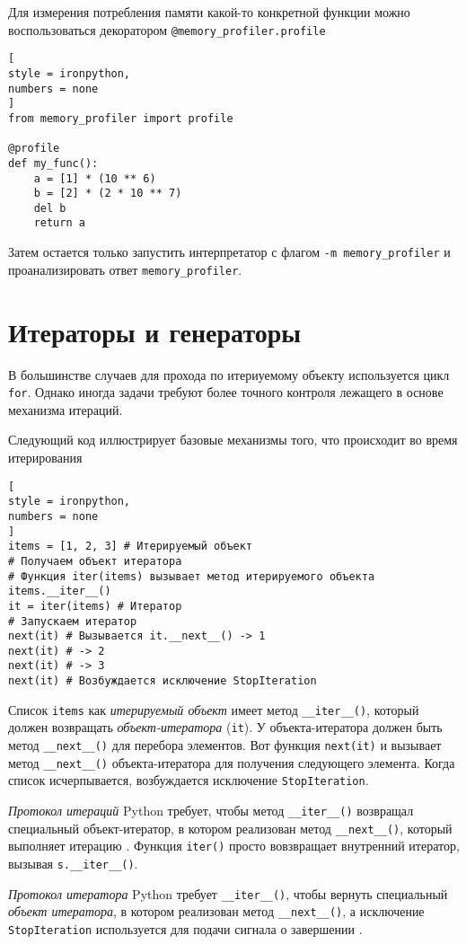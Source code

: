 \documentclass[%
	11pt,
	a4paper,
	utf8,
		]{article}
\begin{document}
Для измерения потребления памяти какой-то конкретной функции можно воспользоваться декоратором \texttt{@memory\_profiler.profile}
\begin{lstlisting}[
style = ironpython,
numbers = none
]
from memory_profiler import profile

@profile
def my_func():
    a = [1] * (10 ** 6)
    b = [2] * (2 * 10 ** 7)
    del b
    return a
\end{lstlisting}

Затем остается только запустить интерпретатор с флагом \verb|-m memory_profiler| и проанализировать ответ \texttt{memory\_profiler}.


\section{Итераторы и генераторы}

В большинстве случаев для прохода по итериуемому объекту используется цикл \texttt{for}. Однако иногда задачи требуют более точного контроля лежащего в основе механизма итераций. 

Следующий код иллюстрирует базовые механизмы того, что происходит во время итерирования
\begin{lstlisting}[
style = ironpython,
numbers = none
]
items = [1, 2, 3] # Итерируемый объект
# Получаем объект итератора
# Функция iter(items) вызывает метод итерируемого объекта items.__iter__()
it = iter(items) # Итератор
# Запускаем итератор
next(it) # Вызывается it.__next__() -> 1
next(it) # -> 2
next(it) # -> 3
next(it) # Возбуждается исключение StopIteration
\end{lstlisting}

Список \texttt{items} как \emph{итерируемый объект} имеет метод \verb|__iter__()|, который должен возвращать \emph{объект-итератора} (\texttt{it}). У объекта-итератора должен быть метод \verb|__next__()| для перебора элементов. Вот функция \texttt{next(it)} и вызывает метод \verb|__next__()| объекта-итератора для получения следующего элемента. Когда список исчерпывается, возбуждается исключение \texttt{StopIteration}.

\emph{Протокол итераций} Python требует, чтобы метод \verb|__iter__()| возвращал специальный объект-итератор, в котором реализован метод \verb|__next__()|, который выполняет итерацию \cite[]{beazley:python_cookbook-2019}. Функция \texttt{iter()} просто вовзвращает внутренний итератор, вызывая \verb|s.__iter__()|.

\emph{Протокол итератора} Python требует \verb|__iter__()|, чтобы вернуть специальный \emph{объект итератора}, в котором реализован метод \verb|__next__()|, а исключение \texttt{StopIteration} используется для подачи сигнала о завершении \cite[]{beazley:python_cookbook-2019}.
\end{document}
